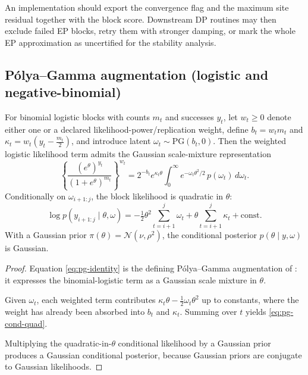 An implementation should export the convergence flag and the maximum site residual together with the
block score. Downstream DP routines may then exclude failed EP blocks, retry them with stronger
damping, or mark the whole EP approximation as uncertified for the stability analysis.

\subsection{Pólya–Gamma augmentation (logistic and negative-binomial)}
\begin{theorem}
\label{thm:pg}
For binomial logistic blocks with counts $m_t$ and successes $y_t$, let $w_t\ge 0$ denote either
one or a declared likelihood-power/replication weight, define
$b_t=w_t m_t$ and $\kappa_t=w_t(y_t-\tfrac{m_t}{2})$, and introduce latent
$\omega_t\sim\mathrm{PG}(b_t,0)$. Then the weighted logistic likelihood term admits the Gaussian
scale-mixture representation
\begin{equation}
\left\{\frac{(e^\theta)^{y_t}}{(1+e^\theta)^{m_t}}\right\}^{w_t}
 = 2^{-b_t} e^{\kappa_t\theta}
   \int_0^\infty e^{-\omega_t\theta^2/2}\,p(\omega_t)\,d\omega_t.
\label{eq:pg-identity}
\end{equation}
Conditionally on $\omega_{i+1:j}$, the block likelihood is quadratic in $\theta$:
\begin{equation}
\log p(y_{i+1:j}\mid \theta,\omega)
 =
 -\tfrac{1}{2}\theta^2 \sum_{t=i+1}^j \omega_t
 + \theta \sum_{t=i+1}^j \kappa_t
 + \mathrm{const}.
\label{eq:pg-cond-quad}
\end{equation}
With a Gaussian prior $\pi(\theta)=\mathcal{N}(\nu,\rho^2)$, the conditional posterior
$p(\theta\mid y,\omega)$ is Gaussian.
\end{theorem}

\begin{proof}
Equation \eqref{eq:pg-identity} is the defining P\'olya--Gamma augmentation of
\citet{polson2013pg}: it expresses the binomial-logistic term as a Gaussian scale mixture in
$\theta$.

Given $\omega_t$, each weighted term contributes $\kappa_t\theta-\tfrac12\omega_t\theta^2$ up to
constants, where the weight has already been absorbed into $b_t$ and $\kappa_t$. Summing over $t$
yields \eqref{eq:pg-cond-quad}.

Multiplying the quadratic-in-$\theta$ conditional likelihood by a Gaussian prior produces a
Gaussian conditional posterior, because Gaussian priors are conjugate to Gaussian likelihoods.
\end{proof}

